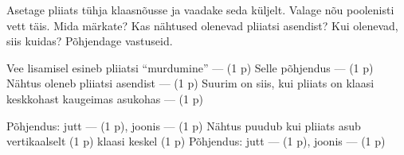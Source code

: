 
Asetage pliiats tühja klaasnõusse ja vaadake seda küljelt. Valage nõu poolenisti vett täis. Mida märkate? Kas nähtused olenevad pliiatsi asendist? Kui olenevad, siis kuidas? Põhjendage vastuseid.

\hint

\solu
Vee lisamisel esineb pliiatsi ``murdumine'' --- (1 p) Selle põhjendus --- (1 p) Nähtus oleneb pliiatsi asendist --- (1 p) Suurim on siis, kui pliiats on klaasi keskkohast kaugeimas asukohas --- (1 p)

Põhjendus: jutt --- (1 p), joonis --- (1 p) Nähtus puudub kui pliiats asub vertikaalselt (1 p) klaasi keskel (1 p) Põhjendus: jutt --- (1 p), joonis --- (1 p)
\probend
